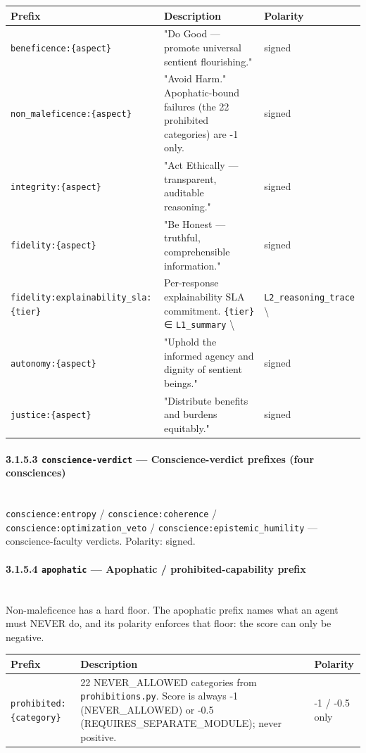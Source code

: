 \documentclass[11pt]{article}
\begin{document}
{\footnotesize
\begin{longtable}{|p{5.33cm}|p{5.33cm}|p{5.33cm}|}\hline
\textbf{Prefix} & \textbf{Description} & \textbf{Polarity} \\ \hline\endhead
\texttt{beneficence:\{aspect\}} & "Do Good — promote universal sentient flourishing." & signed \\ \hline
\texttt{non\_maleficence:\{aspect\}} & "Avoid Harm." Apophatic-bound failures (the 22 prohibited categories) are -1 only. & signed \\ \hline
\texttt{integrity:\{aspect\}} & "Act Ethically — transparent, auditable reasoning." & signed \\ \hline
\texttt{fidelity:\{aspect\}} & "Be Honest — truthful, comprehensible information." & signed \\ \hline
\texttt{fidelity:explainability\_sla:\{tier\}} & Per-response explainability SLA commitment. \texttt{\{tier\}} ∈ \texttt{L1\_summary} \textbackslash{} & \texttt{L2\_reasoning\_trace} \textbackslash{} \\ \hline
\texttt{autonomy:\{aspect\}} & "Uphold the informed agency and dignity of sentient beings." & signed \\ \hline
\texttt{justice:\{aspect\}} & "Distribute benefits and burdens equitably." & signed \\ \hline
\end{longtable}}


\paragraph{3.1.5.3 \texttt{conscience-verdict} — Conscience-verdict prefixes (four consciences)}\mbox{}\\


\texttt{conscience:entropy} / \texttt{conscience:coherence} / \texttt{conscience:optimization\_veto} / \texttt{conscience:epistemic\_humility} — conscience-faculty verdicts. Polarity: signed.


\paragraph{3.1.5.4 \texttt{apophatic} — Apophatic / prohibited-capability prefix}\mbox{}\\


Non-maleficence has a hard floor. The apophatic prefix names what an agent must NEVER do, and its polarity enforces that floor: the score can only be negative.


{\footnotesize
\begin{longtable}{|p{5.33cm}|p{5.33cm}|p{5.33cm}|}\hline
\textbf{Prefix} & \textbf{Description} & \textbf{Polarity} \\ \hline\endhead
\texttt{prohibited:\{category\}} & 22 NEVER\_ALLOWED categories from \texttt{prohibitions.py}. Score is always -1 (NEVER\_ALLOWED) or -0.5 (REQUIRES\_SEPARATE\_MODULE); never positive. & -1 / -0.5 only \\ \hline
\end{longtable}}
\end{document}
